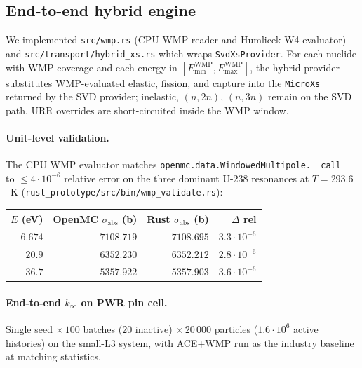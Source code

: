 \subsection{End-to-end hybrid engine}
\label{sec:hybrid_e2e}

We implemented \texttt{src/wmp.rs} (CPU WMP reader and
Humlicek W4 evaluator) and \texttt{src/transport/hybrid\_xs.rs}
which wraps \texttt{SvdXsProvider}. For each nuclide with WMP
coverage and each energy in
$[E_\text{min}^\text{WMP}, E_\text{max}^\text{WMP}]$, the
hybrid provider substitutes WMP-evaluated elastic, fission,
and capture into the \texttt{MicroXs} returned by the SVD
provider; inelastic, $(n,2n)$, $(n,3n)$ remain on the SVD
path. URR overrides are short-circuited inside the WMP window.

\paragraph{Unit-level validation.}
The CPU WMP evaluator matches
\texttt{openmc.data.\-WindowedMultipole.\_\_call\_\_} to
$\leq 4\cdot 10^{-6}$ relative error on the three dominant
U-$238$ resonances at $T = 293.6$~K
(\texttt{rust\_prototype/src/bin/wmp\_validate.rs}):

\begin{center}
\begin{tabular}{@{}rrrr@{}}
\toprule
$E$ (eV) & OpenMC $\sigma_\text{abs}$ (b) & Rust $\sigma_\text{abs}$ (b) & $\Delta$ rel \\
\midrule
$6.674$  & $7108.719$ & $7108.695$ & $3.3 \cdot 10^{-6}$ \\
$20.9$   & $6352.230$ & $6352.212$ & $2.8 \cdot 10^{-6}$ \\
$36.7$   & $5357.922$ & $5357.903$ & $3.6 \cdot 10^{-6}$ \\
\bottomrule
\end{tabular}
\end{center}

\paragraph{End-to-end $k_\infty$ on PWR pin cell.}
Single seed $\times\,100$ batches ($20$ inactive)
$\times\,20\,000$ particles ($1.6 \cdot 10^6$ active
histories) on the small-L3 system, with ACE+WMP run as the
industry baseline at matching statistics.

